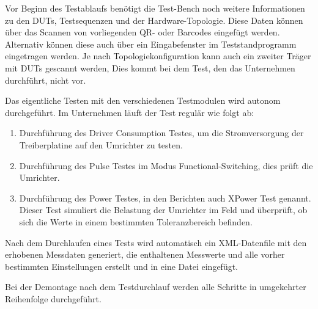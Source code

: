 Vor Beginn des Testablaufs benötigt die Test-Bench noch weitere Informationen zu den \ac{DUTs}, Testsequenzen und der Hardware-Topologie.
Diese Daten können über das Scannen von vorliegenden QR- oder Barcodes eingefügt werden.
Alternativ können diese auch über ein Eingabefenster im Teststandprogramm eingetragen werden.
Je nach Topologiekonfiguration kann auch ein zweiter Träger mit \ac{DUTs} gescannt werden,
Dies kommt bei dem Test, den das Unternehmen durchführt, nicht vor. \cite*{Main_Manuel_USTB2018}

Das eigentliche Testen mit den verschiedenen Testmodulen wird autonom durchgeführt.
Im Unternehmen läuft der Test regulär wie folgt ab:
\begin{enumerate}

\item Durchführung des Driver Consumption Testes, um die Stromversorgung der Treiberplatine auf den Umrichter zu testen.
\item Durchführung des Pulse Testes im Modus Functional-Switching, dies prüft die Umrichter.
\item Durchführung des Power Testes, in den Berichten auch XPower Test genannt.
Dieser Test simuliert die Belastung der Umrichter im Feld und überprüft,
ob sich die Werte in einem bestimmten Toleranzbereich befinden.

\end{enumerate}

Nach dem Durchlaufen eines Tests wird automatisch ein \ac{XML}-Datenfile mit den erhobenen Messdaten generiert,
die enthaltenen Messwerte und alle vorher bestimmten Einstellungen erstellt und in eine Datei eingefügt.

Bei der Demontage nach dem Testdurchlauf werden alle Schritte in umgekehrter Reihenfolge durchgeführt.
\pagebreak



